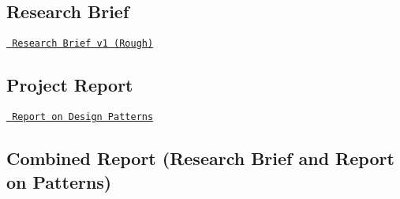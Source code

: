  \subsection*{Research Brief}

\href{https://docs.google.com/document/d/1_26_ehbEiTZ2Xi9fk-cEbWw19J02zTBd/edit?usp=sharing&ouid=112010270683348415189&rtpof=true&sd=true}{\texttt{ Research Brief v1 (Rough)}}

\subsection*{Project Report}

\href{https://docs.google.com/document/d/1usSzrIGBnv6CRmBcQjSZJM7rQqoF0H61nNNkRuSn2eI/edit?usp=share_link}{\texttt{ Report on Design Patterns}}

\subsection*{Combined Report (Research Brief and Report on Patterns)}